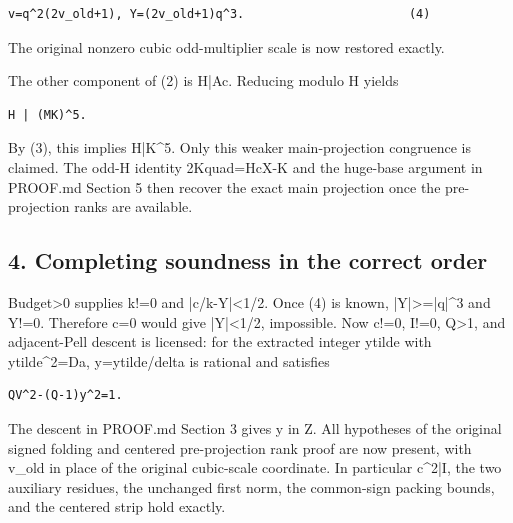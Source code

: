 \begin{verbatim}
v=q^2(2v_old+1), Y=(2v_old+1)q^3.                       (4)
\end{verbatim}

The original nonzero cubic odd-multiplier scale is now restored exactly.



The other component of (2) is H|Ac. Reducing modulo H yields



\begin{verbatim}
H | (MK)^5.
\end{verbatim}

By (3), this implies H|K\textasciicircum{}\allowbreak{}5. Only this weaker main-projection congruence is claimed. The odd-H identity 2Kquad=\allowbreak{}HcX-K and the huge-base argument in PROOF.md Section 5 then recover the exact main projection once the pre-projection ranks are available.



\subsection*{4. Completing soundness in the correct order}



Budget\textgreater{}\allowbreak{}0 supplies k!=\allowbreak{}0 and |c/\allowbreak{}k-Y|\textless{}\allowbreak{}1/\allowbreak{}2. Once (4) is known, |Y|\textgreater{}\allowbreak{}=\allowbreak{}|q|\textasciicircum{}\allowbreak{}3 and Y!=\allowbreak{}0. Therefore c=\allowbreak{}0 would give |Y|\textless{}\allowbreak{}1/\allowbreak{}2, impossible. Now c!=\allowbreak{}0, I!=\allowbreak{}0, Q\textgreater{}\allowbreak{}1, and adjacent-Pell descent is licensed: for the extracted integer ytilde with ytilde\textasciicircum{}\allowbreak{}2=\allowbreak{}Da, y=\allowbreak{}ytilde/\allowbreak{}delta is rational and satisfies



\begin{verbatim}
QV^2-(Q-1)y^2=1.
\end{verbatim}

The descent in PROOF.md Section 3 gives y in Z. All hypotheses of the original signed folding and centered pre-projection rank proof are now present, with v\_\allowbreak{}old in place of the original cubic-scale coordinate. In particular c\textasciicircum{}\allowbreak{}2|I, the two auxiliary residues, the unchanged first norm, the common-sign packing bounds, and the centered strip hold exactly.



